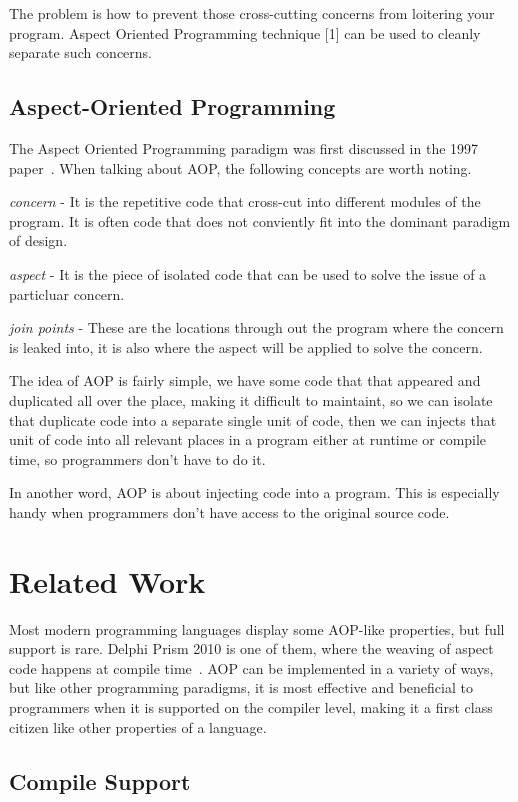The problem is how to prevent those cross-cutting concerns from loitering your program. Aspect Oriented Programming technique [1] can be used to cleanly separate such concerns.

\subsection{Aspect-Oriented Programming}
The Aspect Oriented Programming paradigm was first discussed in the 1997 paper~\cite{aop}. When talking about AOP, the following concepts are worth noting.

{\em concern} - It is the repetitive code that cross-cut into different modules of the program. It is often code that does not conviently fit into the dominant paradigm of design.

{\em aspect} - It is the piece of isolated code that can be used to solve the issue of a particluar concern.

{\em join points} - These are the locations through out the program where the concern is leaked into, it is also where the aspect will be applied to solve the concern.

The idea of AOP is fairly simple, we have some code that that appeared and duplicated all over the place, making it difficult to maintaint, so we can isolate that duplicate code into a separate single unit of code, then we can injects that  unit of code into all relevant places in a program either at runtime or compile time, so programmers don't have to do it.

In another word, AOP is about injecting code into a program. This is especially handy when programmers don't have access to the original source code.

\section{Related Work}Most modern programming languages display some AOP-like properties, but full support is rare. Delphi Prism 2010 is one of them, where the weaving of aspect code happens at compile time~\cite{delphi_prism2010}. AOP can be implemented in a variety of ways, but like other programming paradigms, it is most effective and beneficial to programmers when it is supported on the compiler level, making it a first class citizen like other properties of a language.

\subsection{Compile Support}

